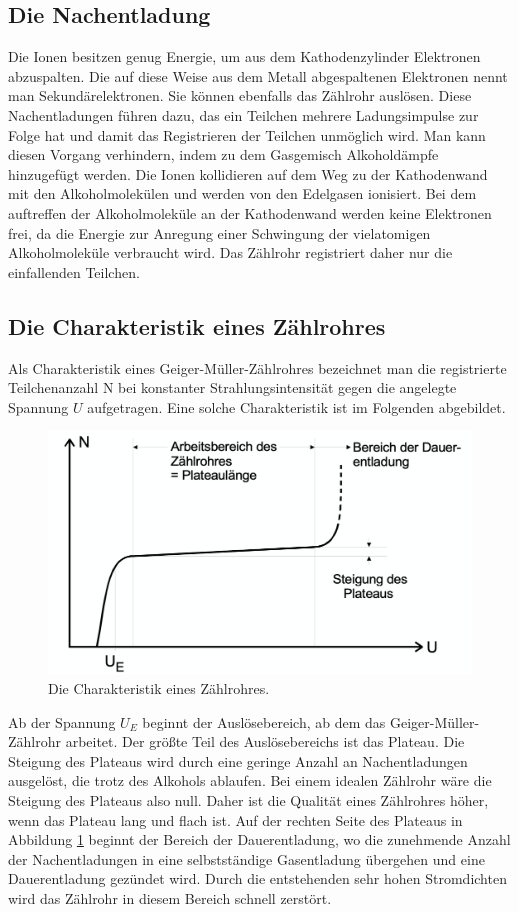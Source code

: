  \subsection{Die Nachentladung}
    Die Ionen besitzen genug Energie, um aus dem Kathodenzylinder Elektronen abzuspalten. Die auf
    diese Weise aus dem Metall abgespaltenen Elektronen nennt man Sekundärelektronen. Sie können
    ebenfalls das Zählrohr auslösen. Diese Nachentladungen führen dazu, das ein Teilchen mehrere
    Ladungsimpulse zur Folge hat und damit das Registrieren der Teilchen unmöglich wird. Man kann
    diesen Vorgang verhindern, indem zu dem Gasgemisch Alkoholdämpfe hinzugefügt werden. Die Ionen
    kollidieren auf dem Weg zu der Kathodenwand mit den Alkoholmolekülen und werden von den Edelgasen
    ionisiert. Bei dem auftreffen der Alkoholmoleküle an der Kathodenwand werden keine Elektronen frei,
    da die Energie zur Anregung einer Schwingung der vielatomigen Alkoholmoleküle verbraucht wird.
    Das Zählrohr registriert daher nur die einfallenden Teilchen.
  \subsection{Die Charakteristik eines Zählrohres}
    Als Charakteristik eines Geiger-Müller-Zählrohres bezeichnet man die registrierte Teilchenanzahl N
    bei konstanter Strahlungsintensität gegen die angelegte Spannung $U$ aufgetragen. Eine solche
    Charakteristik ist im Folgenden abgebildet.
    \begin{figure}
      \centering
      \label{fig:charakteristik1}
      \includegraphics[scale=0.4]{content/Charakteristik}
      \caption{Die Charakteristik eines Zählrohres.}
    \end{figure}
    Ab der Spannung $U_{E}$ beginnt der Auslösebereich, ab dem das Geiger-Müller-Zählrohr arbeitet.
    Der größte Teil des Auslösebereichs ist das Plateau. Die Steigung des Plateaus wird durch eine
    geringe Anzahl an Nachentladungen ausgelöst, die trotz des Alkohols ablaufen. Bei einem idealen
    Zählrohr wäre die Steigung des Plateaus also null. Daher ist die Qualität eines Zählrohres höher,
    wenn das Plateau lang und flach ist. Auf der rechten Seite des Plateaus in Abbildung
    \ref{fig:charakteristik1} beginnt der Bereich der Dauerentladung, wo die zunehmende Anzahl der
    Nachentladungen in eine selbstständige Gasentladung übergehen und eine Dauerentladung gezündet
    wird. Durch die entstehenden sehr hohen Stromdichten wird das Zählrohr in diesem Bereich schnell
    zerstört.
\label{sec:Theorie}
